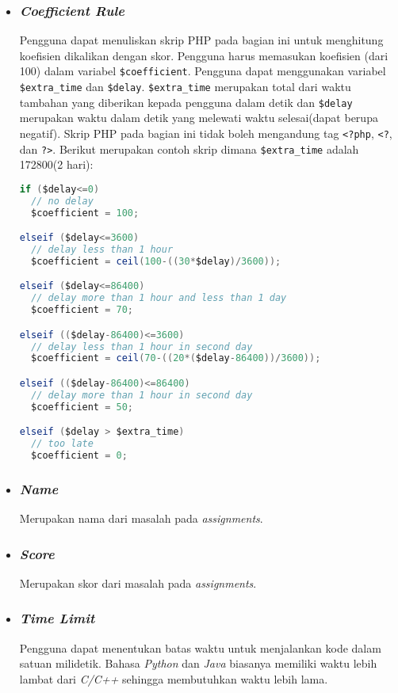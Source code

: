 \begin{itemize}
\item \subsubsection{\textit{Coefficient Rule}}
Pengguna dapat menuliskan skrip PHP pada bagian ini untuk menghitung koefisien dikalikan dengan skor. Pengguna harus memasukan koefisien (dari 100) dalam variabel \verb|$coefficient|. Pengguna dapat menggunakan variabel \verb|$extra_time| dan \verb|$delay|. \verb|$extra_time| merupakan total dari waktu tambahan yang diberikan kepada pengguna dalam detik dan \verb|$delay| merupakan waktu dalam detik yang melewati waktu selesai(dapat berupa negatif). Skrip PHP pada bagian ini tidak boleh mengandung tag \verb|<?php|, \verb|<?|, dan \verb|?>|. Berikut merupakan contoh skrip dimana \verb|$extra_time| adalah 172800(2 hari):

\begin{lstlisting}[language=Java, caption=Contoh skrip PHP, label=kode:coefficientrule]
if ($delay<=0)
  // no delay
  $coefficient = 100;

elseif ($delay<=3600)
  // delay less than 1 hour
  $coefficient = ceil(100-((30*$delay)/3600));

elseif ($delay<=86400)
  // delay more than 1 hour and less than 1 day
  $coefficient = 70;

elseif (($delay-86400)<=3600)
  // delay less than 1 hour in second day
  $coefficient = ceil(70-((20*($delay-86400))/3600));

elseif (($delay-86400)<=86400)
  // delay more than 1 hour in second day
  $coefficient = 50;

elseif ($delay > $extra_time)
  // too late
  $coefficient = 0;
\end{lstlisting}

\item \subsubsection{\textit{Name}}
Merupakan nama dari masalah pada \textit{assignments}.

\item \subsubsection{\textit{Score}}
Merupakan skor dari masalah pada \textit{assignments}. 

\item \subsubsection{\textit{Time Limit}}
Pengguna dapat menentukan batas waktu untuk menjalankan kode dalam satuan milidetik. Bahasa \textit{Python} dan \textit{Java} biasanya memiliki waktu lebih lambat dari \textit{C/C++} sehingga membutuhkan waktu lebih lama.


\end{itemize}
